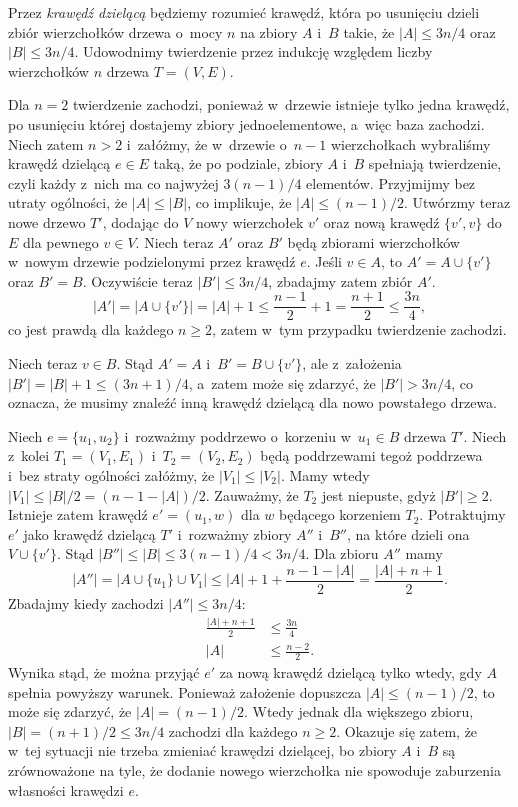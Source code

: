 
\subproblem %
Przez \emph{krawędź dzielącą} będziemy rozumieć krawędź, która po usunięciu dzieli zbiór wierzchołków drzewa o~mocy $n$ na zbiory $A$ i~$B$ takie, że $|A|\le3n/4$ oraz $|B|\le3n/4$. Udowodnimy twierdzenie przez indukcję względem liczby wierzchołków $n$ drzewa $T=(V,E)$.

Dla $n=2$ twierdzenie zachodzi, ponieważ w~drzewie istnieje tylko jedna krawędź, po usunięciu której dostajemy zbiory jednoelementowe, a~więc baza zachodzi. Niech zatem $n>2$ i~załóżmy, że w~drzewie o~$n-1$ wierzchołkach wybraliśmy krawędź dzielącą $e\in E$ taką, że po podziale, zbiory $A$ i~$B$ spełniają twierdzenie, czyli każdy z~nich ma co najwyżej $3(n-1)/4$ elementów. Przyjmijmy bez utraty ogólności, że $|A|\le|B|$, co implikuje, że $|A|\le(n-1)/2$. Utwórzmy teraz nowe drzewo $T'$, dodając do $V$ nowy wierzchołek $v'$ oraz nową krawędź $\{v',v\}$ do $E$ dla pewnego $v\in V$. Niech teraz $A'$ oraz $B'$ będą zbiorami wierzchołków w~nowym drzewie podzielonymi przez krawędź $e$. Jeśli $v\in A$, to $A'=A\cup\{v'\}$ oraz $B'=B$. Oczywiście teraz $|B'|\le3n/4$, zbadajmy zatem zbiór $A'$.
\[
	|A'| = \bigl|A\cup\{v'\}\bigr| = |A|+1 \le \frac{n-1}{2}+1 = \frac{n+1}{2} \le \frac{3n}{4},
\]
co jest prawdą dla każdego $n\ge2$, zatem w~tym przypadku twierdzenie zachodzi.

Niech teraz $v\in B$. Stąd $A'=A$ i~$B'=B\cup \{v'\}$, ale z~założenia $|B'|=|B|+1\le(3n+1)/4$, a~zatem może się zdarzyć, że $|B'|>3n/4$, co oznacza, że musimy znaleźć inną krawędź dzielącą dla nowo powstałego drzewa.

Niech $e=\{u_1,u_2\}$ i~rozważmy poddrzewo o~korzeniu w~$u_1\in B$ drzewa $T'$. Niech z~kolei $T_1=(V_1,E_1)$ i~$T_2=(V_2,E_2)$ będą poddrzewami tegoż poddrzewa i~bez straty ogólności załóżmy, że $|V_1|\le|V_2|$. Mamy wtedy $|V_1|\le|B|/2=(n-1-|A|)/2$. Zauważmy, że $T_2$ jest niepuste, gdyż $|B'|\ge2$. Istnieje zatem krawędź $e'=(u_1,w)$ dla $w$ będącego korzeniem $T_2$. Potraktujmy $e'$ jako krawędź dzielącą $T'$ i~rozważmy zbiory $A''$ i~$B''$, na które dzieli ona $V\cup\{v'\}$. Stąd $|B''|\le|B|\le3(n-1)/4<3n/4$. Dla zbioru $A''$ mamy
\[
	|A''| = \bigl|A\cup\{u_1\}\cup V_1\bigr| \le |A|+1+\frac{n-1-|A|}{2} = \frac{|A|+n+1}{2}.
\]
Zbadajmy kiedy zachodzi $|A''|\le3n/4$:
\begin{align*}
	\frac{|A|+n+1}{2} &\le \frac{3n}{4} \\
	|A| &\le \frac{n-2}{2}.
\end{align*}
Wynika stąd, że można przyjąć $e'$ za nową krawędź dzielącą tylko wtedy, gdy $A$ spełnia powyższy warunek. Ponieważ założenie dopuszcza $|A|\le(n-1)/2$, to może się zdarzyć, że $|A|=(n-1)/2$. Wtedy jednak dla większego zbioru, $|B|=(n+1)/2\le3n/4$ zachodzi dla każdego $n\ge2$. Okazuje się zatem, że w~tej sytuacji nie trzeba zmieniać krawędzi dzielącej, bo zbiory $A$ i~$B$ są zrównoważone na tyle, że dodanie nowego wierzchołka nie spowoduje zaburzenia własności krawędzi $e$. 

